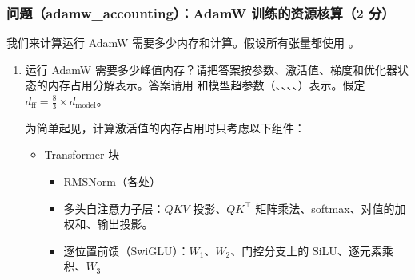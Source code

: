 \subsubsection*{问题（adamw\_accounting）：AdamW 训练的资源核算（2 分）}

我们来计算运行 AdamW 需要多少内存和计算。假设所有张量都使用 。

\begin{enumerate}
  \item[(a)] 运行 AdamW 需要多少峰值内存？请把答案按参数、激活值、梯度和优化器状态的内存占用分解表示。答案请用  和模型超参数（、、、、）表示。假定 $d_{\mathrm{ff}} = \tfrac{8}{3} \times d_{\mathrm{model}}$。

  为简单起见，计算激活值的内存占用时只考虑以下组件：
  \begin{itemize}
    \item Transformer 块
    \begin{itemize}
      \item RMSNorm（各处）
      \item 多头自注意力子层：$QKV$ 投影、$QK^{\top}$ 矩阵乘法、softmax、对值的加权和、输出投影。
      \item 逐位置前馈（SwiGLU）：$W_1$、$W_2$、门控分支上的 SiLU、逐元素乘积、$W_3$
    \end{itemize}
  \end{itemize}
\end{enumerate}
